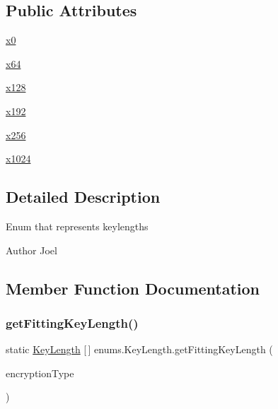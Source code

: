 \subsection*{Public Attributes}
\begin{DoxyCompactItemize}
\item 
\mbox{\hyperlink{enumenums_1_1_key_length_a08414039b2bd5688cf9779cce0df9b09}{x0}}
\item 
\mbox{\hyperlink{enumenums_1_1_key_length_acb431c4bd6d2fad80c884e4db85346b6}{x64}}
\item 
\mbox{\hyperlink{enumenums_1_1_key_length_a8e7a9ec51db7faed431255bd05674624}{x128}}
\item 
\mbox{\hyperlink{enumenums_1_1_key_length_a6633ed3358195671b816db82665652b2}{x192}}
\item 
\mbox{\hyperlink{enumenums_1_1_key_length_ae39cf53f9991861baf5db4e806553f7e}{x256}}
\item 
\mbox{\hyperlink{enumenums_1_1_key_length_a7076a11d36efd087c9dbdf88c50b1af7}{x1024}}
\end{DoxyCompactItemize}


\subsection{Detailed Description}
Enum that represents keylengths \begin{DoxyAuthor}{Author}
Joel 
\end{DoxyAuthor}


\subsection{Member Function Documentation}
\mbox{\label{enumenums_1_1_key_length_afcdc6e370c70b47131b467b708c30f2f}} 
\subsubsection{\texorpdfstring{get\+Fitting\+Key\+Length()}{getFittingKeyLength()}}
{\footnotesize\ttfamily static \mbox{\hyperlink{enumenums_1_1_key_length}{Key\+Length}} \mbox{[}$\,$\mbox{]} enums.\+Key\+Length.\+get\+Fitting\+Key\+Length (\begin{DoxyParamCaption}\item[{\mbox{\hyperlink{enumenums_1_1_encryption_type}{Encryption\+Type}}}]{encryption\+Type }\end{DoxyParamCaption})\hspace{0.3cm}{\ttfamily [static]}}

